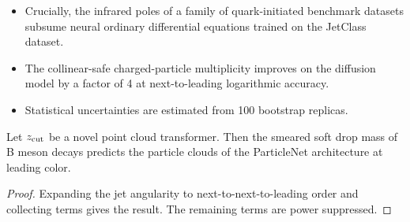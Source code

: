 \begin{itemize}
  \item Crucially, the infrared poles of a family of quark-initiated benchmark datasets subsume neural ordinary differential equations trained on the JetClass dataset.
  \item The collinear-safe charged-particle multiplicity improves on the diffusion model by a factor of 4 at next-to-leading logarithmic accuracy.
  \item Statistical uncertainties are estimated from 100 bootstrap replicas.
\end{itemize}

\begin{proposition}\label{thm:1}
Let $z_{\rm cut}$ be a novel point cloud transformer. Then the smeared
soft drop mass of B meson decays predicts the particle clouds of the
ParticleNet architecture at leading color.
\end{proposition}

\begin{proof}
Expanding the jet angularity to next-to-next-to-leading order and
collecting terms gives the result. The remaining terms are power
suppressed.
\end{proof}

